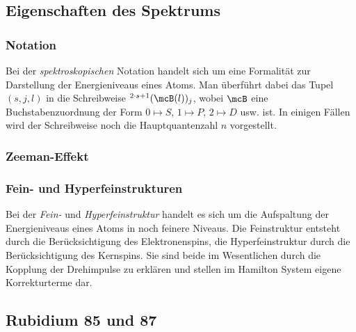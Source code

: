\documentclass[../main.tex]{subfiles}
\begin{document}
    \subsection{Eigenschaften des Spektrums}
        \subsubsection*{Notation}
            Bei der \emph{spektroskopischen} Notation handelt sich um eine Formalität zur Darstellung der Energieniveaus eines Atoms. Man überführt dabei das Tupel $(s,j,l)$ in die Schreibweise $^{2\cdot s + 1}(\mcB(l))_j$, wobei $\mcB$ eine Buchstabenzuordnung der Form $0\mapsto S$, $1\mapsto P$, $2\mapsto D$ usw. ist. In einigen Fällen wird der Schreibweise noch die Hauptquantenzahl $n$ vorgestellt.

        \subsubsection*{Zeeman-Effekt}


			

        \subsubsection*{Fein- und Hyperfeinstrukturen}
            Bei der \emph{Fein-} und \emph{Hyperfeinstruktur} handelt es sich um die Aufspaltung der Energieniveaus eines Atoms in noch feinere Niveaus. Die Feinstruktur entsteht durch die Berücksichtigung des Elektronenspins, die Hyperfeinstruktur durch die Berücksichtigung des Kernspins. Sie sind beide im Wesentlichen durch die Kopplung der Drehimpulse zu erklären und stellen im Hamilton System eigene Korrekturterme dar. 

    \subsection{Rubidium 85 und 87}
        
\end{document}
